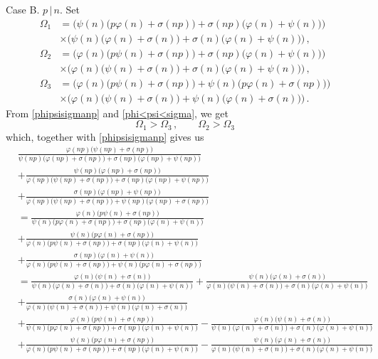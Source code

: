 \documentclass[12pt]{article}
\begin{document}
Case B. \;  $p\,|\,n$. Set
\begin{align*}
\Omega_1&=\Big(\psi(n)\big(p\varphi(n)+\sigma(np)\big)+\sigma(np)\big(\varphi(n)+\psi(n)\big)\Big)\\
&\times\Big(\psi(n)\big(\varphi(n)+\sigma(n)\big)+\sigma(n)\big(\varphi(n)+\psi(n)\big)\Big)\,,\\
\Omega_2&=\Big(\varphi(n)\big(p\psi(n)+\sigma(np)\big)+\sigma(np)\big(\varphi(n)+\psi(n)\big)\Big)\\
&\times\Big(\varphi(n)\big(\psi(n)+\sigma(n)\big)+\sigma(n)\big(\varphi(n)+\psi(n)\big)\Big)\,,\\
\Omega_3&=\Big(\varphi(n)\big(p\psi(n)+\sigma(np)\big)+\psi(n)\big(p\varphi(n)+\sigma(np)\big)\Big)\\
&\times\Big(\varphi(n)\big(\psi(n)+\sigma(n)\big)+\psi(n)\big(\varphi(n)+\sigma(n)\big)\Big)\,.
\end{align*}
From \eqref{phipsisigmanp} and \eqref{phi<psi<sigma}, we get
\begin{equation*}
\Omega_1>\Omega_3\,, \qquad \Omega_2>\Omega_3
\end{equation*}
which, together with \eqref{phipsisigmanp} gives us
\begin{align*}
&\frac{\varphi(np)\big(\psi(np)+\sigma(np)\big)}{\psi(np)\big(\varphi(np)+\sigma(np)\big)+\sigma(np)\big(\varphi(np)+\psi(np)\big)}\\
&+\frac{\psi(np)\big(\varphi(np)+\sigma(np)\big)}{\varphi(np)\big(\psi(np)+\sigma(np)\big)+\sigma(np)\big(\varphi(np)+\psi(np)\big)}\\
&+\frac{\sigma(np)\big(\varphi(np)+\psi(np)\big)}{\varphi(np)\big(\psi(np)+\sigma(np)\big)+\psi(np)\big(\varphi(np)+\sigma(np)\big)}\\
&=\frac{\varphi(n)\big(p\psi(n)+\sigma(np)\big)}{\psi(n)\big(p\varphi(n)+\sigma(np)\big)+\sigma(np)\big(\varphi(n)+\psi(n)\big)}\\
&+\frac{\psi(n)\big(p\varphi(n)+\sigma(np)\big)}{\varphi(n)\big(p\psi(n)+\sigma(np)\big)+\sigma(np)\big(\varphi(n)+\psi(n)\big)}\\
&+\frac{\sigma(np)\big(\varphi(n)+\psi(n)\big)}{\varphi(n)\big(p\psi(n)+\sigma(np)\big)+\psi(n)\big(p\varphi(n)+\sigma(np)\big)}\\
&=\frac{\varphi(n)\big(\psi(n)+\sigma(n)\big)}{\psi(n)\big(\varphi(n)+\sigma(n)\big)+\sigma(n)\big(\varphi(n)+\psi(n)\big)}
+\frac{\psi(n)\big(\varphi(n)+\sigma(n)\big)}{\varphi(n)\big(\psi(n)+\sigma(n)\big)+\sigma(n)\big(\varphi(n)+\psi(n)\big)}\\
&+\frac{\sigma(n)\big(\varphi(n)+\psi(n)\big)}{\varphi(n)\big(\psi(n)+\sigma(n)\big)+\psi(n)\big(\varphi(n)+\sigma(n)\big)}\\
&+\frac{\varphi(n)\big(p\psi(n)+\sigma(np)\big)}{\psi(n)\big(p\varphi(n)+\sigma(np)\big)+\sigma(np)\big(\varphi(n)+\psi(n)\big)}
-\frac{\varphi(n)\big(\psi(n)+\sigma(n)\big)}{\psi(n)\big(\varphi(n)+\sigma(n)\big)+\sigma(n)\big(\varphi(n)+\psi(n)\big)}\\
&+\frac{\psi(n)\big(p\varphi(n)+\sigma(np)\big)}{\varphi(n)\big(p\psi(n)+\sigma(np)\big)+\sigma(np)\big(\varphi(n)+\psi(n)\big)}
-\frac{\psi(n)\big(\varphi(n)+\sigma(n)\big)}{\varphi(n)\big(\psi(n)+\sigma(n)\big)+\sigma(n)\big(\varphi(n)+\psi(n)\big)}\\
\end{align*}
\end{document}
